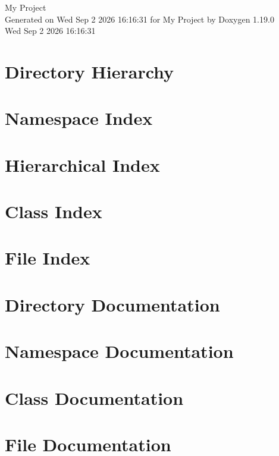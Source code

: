 \documentclass[twoside]{book}
\newcommand{\+}{\discretionary{\mbox{\scriptsize$\hookleftarrow$}}{}{}}
\newcommand{\clearemptydoublepage}{%
    \newpage{\pagestyle{empty}\cleardoublepage}%
  }
\begin{document}
  \raggedbottom
    \hypersetup{pageanchor=false,
                bookmarksnumbered=true,
                pdfencoding=unicode
               }
  \begin{titlepage}
  \vspace*{7cm}
  \begin{center}%
  {\Large My Project}\\
  \vspace*{1cm}
  {\large Generated on Wed Sep 2 2026 16:\+16:\+31 for My Project by Doxygen 1.19.0}\\
    \vspace*{0.5cm}
    {\small Wed Sep 2 2026 16:16:31}
  \end{center}
  \end{titlepage}
  \clearemptydoublepage
  \tableofcontents
  \clearemptydoublepage
  \hypersetup{pageanchor=true}

\chapter{Directory Hierarchy}

\chapter{Namespace Index}

\chapter{Hierarchical Index}

\chapter{Class Index}

\chapter{File Index}

\chapter{Directory Documentation}

\chapter{Namespace Documentation}

\chapter{Class Documentation}


\chapter{File Documentation}


  \backmatter
  \newpage
  \clearemptydoublepage
  \printindex
\end{document}

